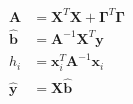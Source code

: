 \documentclass[10pt]{article}
\begin{document}
\begin{align*}\begin{split}
\boldsymbol A &= \boldsymbol X^T \boldsymbol X + \boldsymbol \Gamma^T \boldsymbol \Gamma \\
\boldsymbol{\hat{b}} &= \boldsymbol A^{-1} \boldsymbol X^T \boldsymbol y \\
h_i &= \boldsymbol x_i^T \boldsymbol A^{-1} \boldsymbol x_i \\
\boldsymbol{\hat{y}} &= \boldsymbol X \boldsymbol{\hat{b}} \\
\end{split}\end{align*}
\end{document}
